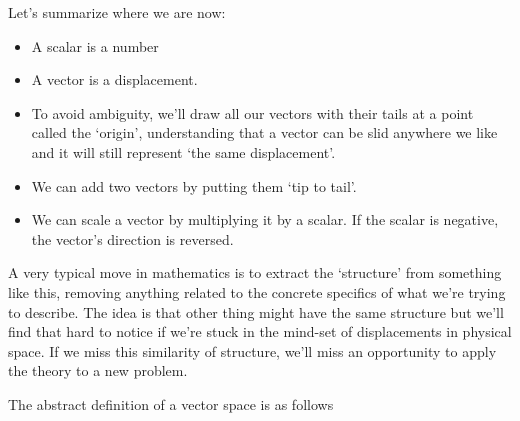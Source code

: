 \documentclass[oneside,english]{amsbook}
\numberwithin{section}{chapter}
\theoremstyle{plain}
\theoremstyle{definition}
\begin{document}
Let's summarize where we are now:

\begin{itemize}
	\item
	A scalar is a number
	\item
	A vector is a displacement.
	\item
	To avoid ambiguity, we'll draw all our vectors with their tails at a
	point called the `origin', understanding that a vector can be slid
	anywhere we like and it will still represent `the same
	displacement'.
	\item
	We can add two vectors by putting them `tip to tail'.
	\item
	We can scale a vector by multiplying it by a scalar. If the scalar is
	negative, the vector's direction is reversed.
\end{itemize}

A very typical move in mathematics is to extract the `structure' from
something like this, removing anything related to the concrete specifics
of what we're trying to describe. The idea is that other thing might
have the same structure but we'll find that hard to notice if we're
stuck in the mind-set of displacements in physical space. If we miss
this similarity of structure, we'll miss an opportunity to apply the
theory to a new problem.

The abstract definition of a vector space is as follows
\end{document}
